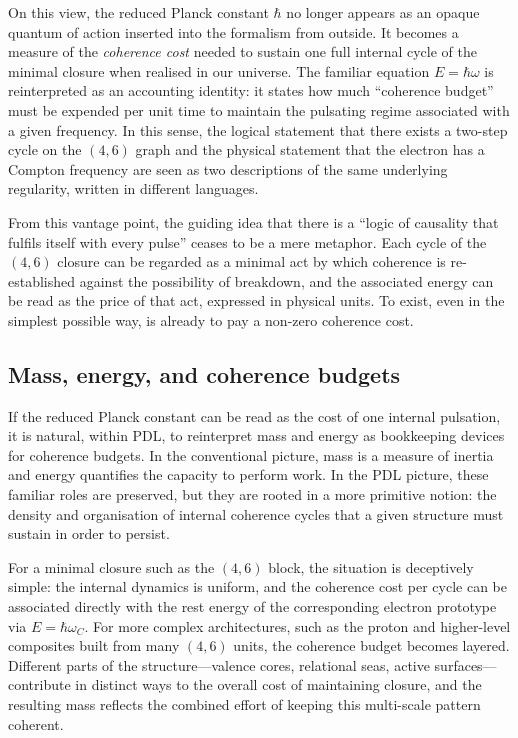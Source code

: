 \documentclass[11pt,a4paper]{article}
\theoremstyle{definition}
\begin{document}
On this view, the reduced Planck constant \(\hbar\) no longer appears as an opaque quantum of action inserted into the formalism from outside. It becomes a measure of the \emph{coherence cost} needed to sustain one full internal cycle of the minimal closure when realised in our universe.\cite{Laubscher_EmergencePhysicalReality_2024,Laubscher_PDL_Position_2024} The familiar equation \(E = \hbar \omega\) is reinterpreted as an accounting identity: it states how much ``coherence budget'' must be expended per unit time to maintain the pulsating regime associated with a given frequency. In this sense, the logical statement that there exists a two-step cycle on the \((4,6)\) graph and the physical statement that the electron has a Compton frequency are seen as two descriptions of the same underlying regularity, written in different languages.

From this vantage point, the guiding idea that there is a ``logic of causality that fulfils itself with every pulse'' ceases to be a mere metaphor. Each cycle of the \((4,6)\) closure can be regarded as a minimal act by which coherence is re-established against the possibility of breakdown, and the associated energy can be read as the price of that act, expressed in physical units.\cite{Laubscher_Existence_PulsatingClosure_2026} To exist, even in the simplest possible way, is already to pay a non-zero coherence cost.

\subsection{Mass, energy, and coherence budgets}

If the reduced Planck constant can be read as the cost of one internal pulsation, it is natural, within PDL, to reinterpret mass and energy as bookkeeping devices for coherence budgets.\cite{Laubscher_EmergencePhysicalReality_2024,Laubscher_Existence_PulsatingClosure_2026} In the conventional picture, mass is a measure of inertia and energy quantifies the capacity to perform work. In the PDL picture, these familiar roles are preserved, but they are rooted in a more primitive notion: the density and organisation of internal coherence cycles that a given structure must sustain in order to persist.

For a minimal closure such as the \((4,6)\) block, the situation is deceptively simple: the internal dynamics is uniform, and the coherence cost per cycle can be associated directly with the rest energy of the corresponding electron prototype via \(E = \hbar \omega_C\).\cite{Laubscher_EmergencePhysicalReality_2024,Laubscher_Schrodinger_Compat_v2_2024} For more complex architectures, such as the proton and higher-level composites built from many \((4,6)\) units, the coherence budget becomes layered. Different parts of the structure---valence cores, relational seas, active surfaces---contribute in distinct ways to the overall cost of maintaining closure, and the resulting mass reflects the combined effort of keeping this multi-scale pattern coherent.\cite{Laubscher_ProtonArch_v2_2024,Laubscher_Alpha_v2_2024}
\end{document}
